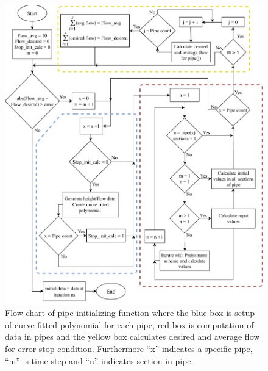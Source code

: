 {\begin{figure}[H]
\centering
\includegraphics[width=1.05 \textwidth]{report/simulation/pictures/init_pipe_chart.pdf}
\caption{Flow chart of pipe initializing function where the blue box is setup of curve fitted polynomial for each pipe, red box is computation of data in pipes and the yellow box calculates desired and average flow for error stop condition. Furthermore ``x'' indicates a specific pipe, ``m'' is time step and ``n'' indicates section in pipe.}
\label{fig:init_pipe_chart}
\end{figure}

}
